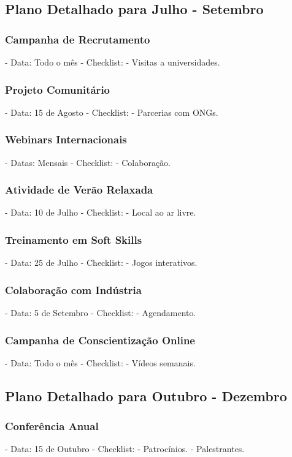 \documentclass[12pt]{article}
\begin{document}
\subsection{Plano Detalhado para Julho - Setembro}

\subsubsection{Campanha de Recrutamento}
- Data: Todo o mês
- Checklist:
  - Visitas a universidades.

\subsubsection{Projeto Comunitário}
- Data: 15 de Agosto
- Checklist:
  - Parcerias com ONGs.

\subsubsection{Webinars Internacionais}
- Datas: Mensais
- Checklist:
  - Colaboração.

\subsubsection{Atividade de Verão Relaxada}
- Data: 10 de Julho
- Checklist:
  - Local ao ar livre.

\subsubsection{Treinamento em Soft Skills}
- Data: 25 de Julho
- Checklist:
  - Jogos interativos.

\subsubsection{Colaboração com Indústria}
- Data: 5 de Setembro
- Checklist:
  - Agendamento.

\subsubsection{Campanha de Conscientização Online}
- Data: Todo o mês
- Checklist:
  - Vídeos semanais.

\subsection{Plano Detalhado para Outubro - Dezembro}

\subsubsection{Conferência Anual}
- Data: 15 de Outubro
- Checklist:
  - Patrocínios.
  - Palestrantes.
\end{document}
